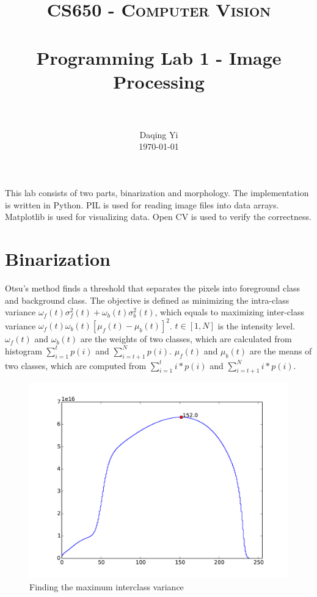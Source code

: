 \documentclass[paper=a4, fontsize=11pt]{scrartcl}
\title{
		\usefont{OT1}{bch}{b}{n}
		\normalfont \normalsize \textsc{CS650 - Computer Vision} \\ [25pt]
		\horrule{0.5pt} \\[0.4cm]
		\huge Programming Lab 1 - Image Processing \\
		\horrule{2pt} \\[0.5cm]
}
\author{
		\normalfont 								\normalsize
        Daqing Yi\\[-3pt]		\normalsize
        \today
}
\date{}
\numberwithin{equation}{section}		%
\numberwithin{figure}{section}			%
\numberwithin{table}{section}				%
\begin{document}
\maketitle




This lab consists of two parts, binarization and morphology.
The implementation is written in Python.
PIL is used for reading image files into data arrays.
Matplotlib is used for visualizing data.
Open CV is used to verify the correctness.

\section{Binarization}

Otsu's method finds a threshold that separates the pixels into foreground class and background class.
The objective is defined as minimizing the intra-class variance $ \omega_{f} (t) \sigma_{f}^{2} (t) + \omega_{b} (t) \sigma_{b}^{2} (t) $, which equals to maximizing inter-class variance $ \omega_{f} (t) \omega_{b} (t) [ \mu_{f} (t) - \mu_{b} (t) ]^{2} $.
$ t \in [1, N] $ is the intensity level.
$ \omega_{f} (t) $ and $ \omega_{b} (t) $ are the weights of two classes, which are calculated from histogram $ \sum_{i=1}^{t} p(i) $ and $ \sum_{i=t+1}^{N} p(i) $.
$ \mu_{f} (t) $ and $ \mu_{b} (t) $ are the means of two classes, which are computed from $ \sum_{i=1}^{t} i * p(i) $ and $ \sum_{i=t+1}^{N} i * p(i) $.

\begin{figure}
\centering
\includegraphics[width=0.5\linewidth]{./figure/interclass_variances}
\caption{Finding the maximum interclass variance}
\label{fig:interclass_variances}
\end{figure}
\end{document}
